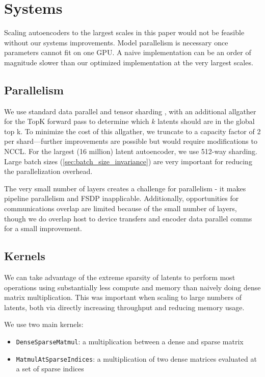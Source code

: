 
\section{Systems}
\label{sec:systems}



Scaling autoencoders to the largest scales in this paper would not be feasible without our systems improvements.  Model parallelism is necessary once parameters cannot fit on one GPU.  A naive implementation can be an order of magnitude slower than our optimized implementation at the very largest scales.

\subsection{Parallelism}

We use standard data parallel and tensor sharding \citep{shoeybi2019megatron}, with an additional allgather for the TopK forward pass to determine which $k$ latents should are in the global top k. To minimize the cost of this allgather, we truncate to a capacity factor of 2 per shard---further improvements are possible but would require modifications to NCCL. For the largest (16 million) latent autoencoder, we use 512-way sharding. Large batch sizes (\autoref{sec:batch_size_invariance}) are very important for reducing the parallelization overhead.

The very small number of layers creates a challenge for parallelism - it makes pipeline parallelism \citep{huang2019gpipe}
and FSDP \citep{zhao2023pytorch} inapplicable. Additionally, opportunities for communications overlap are limited because of the small number of layers, though we do overlap host to device transfers and encoder data parallel comms for a small improvement.

\subsection{Kernels}
\label{sec:kernels}

We can take advantage of the extreme sparsity of latents to perform most operations using substantially less compute and memory than naively doing dense matrix multiplication.  This was important when scaling to large numbers of latents, both via directly increasing throughput and reducing memory usage.

We use two main kernels:
\begin{itemize}
\item \texttt{DenseSparseMatmul}: a multiplication between a dense and sparse matrix
\item \texttt{MatmulAtSparseIndices}: a multiplication of two dense matrices evaluated at a set of sparse indices
\end{itemize}

